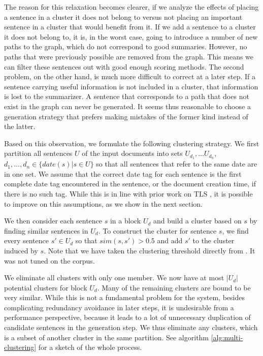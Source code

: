 \documentclass[a4paper,BCOR=10mm]{report}
\numberwithin{lemma}{chapter}
\numberwithin{definition}{chapter}
\begin{document}
The reason for this relaxation becomes clearer, if we analyze the effects of placing a sentence in a cluster it does not belong to versus not placing an important sentence in a cluster that would benefit from it.
If we add a sentence to a cluster it does not belong to, it is, in the worst case, going to introduce a number of new paths to the graph, which do not correspond to good summaries. However, no paths that were previously possible are removed from the graph. This means we can filter these sentences out with good enough scoring methods.
The second problem, on the other hand, is much more difficult to correct at a later step. If a sentence carrying useful information is not included in a cluster, that information is lost to the summarizer. A sentence that corresponds to a path that does not exist in the graph can never be generated. It seems thus reasonable to choose a generation strategy that prefers making mistakes of the former kind instead of the latter.

Based on this observation, we formulate the following clustering strategy. We first partition all sentences $U$ of the input documents into sets $U_{d_1}, \dots U_{d_n}$, $d_1, \dots, d_n \in \{ date(s) | s \in U \}$ so that all sentences that refer to the same date are in one set. We assume that the correct date tag for each sentence is the first complete date tag encountered in the sentence, or the document creation time, if there is no such tag. While this is in line with prior work on TLS \citep{chieu, markert}, it is possible to improve on this assumptions, as we show in the next section.

We then consider each sentence $s$ in a block $U_d$ and build a cluster based on $s$ by finding similar sentences in $U_d$.
To construct the cluster for sentence $s$, we find every sentence $s' \in U_d$ so that $\mathit{sim}(s, s') > 0.5$ and add $s'$ to the cluster induced by $s$. Note that we have taken the clustering threshold directly from \citet{banerjee}. It was not tuned on the corpus.

We eliminate all clusters with only one member. We now have at most $|U_d|$ potential clusters for block $U_d$.
Many of the remaining clusters are bound to be very similar. While this is not a fundamental problem for the system, besides complicating redundancy avoidance in later steps, it is undesirable from a performance perspective, because it leads to a lot of unnecessary duplication of candidate sentences in the generation step.
We thus eliminate any clusters, which is a subset of another cluster in the same partition. See algorithm \ref{alg:multi-clustering} for a sketch of the whole process.
\end{document}
